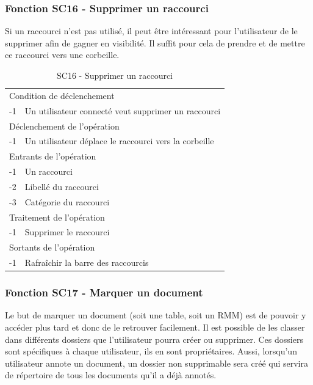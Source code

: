 \documentclass[a4paper]{article}
\begin{document}
\subsubsection{Fonction SC16 - Supprimer un raccourci}
Si un raccourci n’est pas utilisé, il peut être intéressant pour l’utilisateur de le supprimer afin de gagner en visibilité. Il suffit pour cela de prendre et de mettre ce raccourci vers une corbeille.\\
\begin{table}[H]
  \centering
   \small
	\begin{tabular}{|c|p{12cm}|}
   		\hline
   			\rowcolor{lightgray}\multicolumn{2}{|c|}{\textbf{SC16 - Supprimer un raccourci}} \\
   		\hline
   			\multicolumn{2}{|l|}{Condition de d\'eclenchement} \\
   		\hline
   			-1 & Un utilisateur connecté veut supprimer un raccourci\\
   		\hline
   			\multicolumn{2}{|l|}{D\'eclenchement de l'op\'eration} \\
   		\hline
   			-1 & Un utilisateur déplace le raccourci vers la corbeille\\
   		\hline
   			\multicolumn{2}{|l|}{Entrants de l'op\'eration} \\
   		\hline
   			-1 &  Un raccourci \\
   			-2 &  Libellé du raccourci \\
   			-3 &  Catégorie du raccourci \\
   		\hline
   			\multicolumn{2}{|l|}{Traitement de l'op\'eration} \\
  		\hline
   			-1 & Supprimer le raccourci\\
   		\hline
   			\multicolumn{2}{|l|}{Sortants de l'op\'eration} \\
   		\hline
   			-1 & Rafraîchir la barre des raccourcis\\
   		\hline
	\end{tabular}
  \caption{SC16 - Supprimer un raccourci}
  \normalsize
  \label{tab:supprimer_raccourci}
\end{table}



\subsubsection{Fonction SC17 - Marquer un document}
Le but de marquer un document (soit une table, soit un RMM) est de pouvoir y accéder plus tard et donc de le retrouver facilement. Il est possible de les classer dans différents dossiers que l'utilisateur pourra créer ou supprimer. Ces dossiers sont sp\'ecifiques \`a chaque utilisateur, ils en sont propriétaires. Aussi, lorsqu'un utilisateur annote un document, un dossier non supprimable sera créé qui servira de répertoire de tous les documents qu'il a déjà annotés. 
\end{document}
